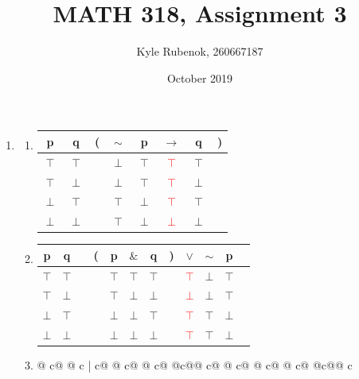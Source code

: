 \documentclass{article}
\title{MATH 318, Assignment 3}
\author{Kyle Rubenok, 260667187}
\date{October 2019}
\begin{document}
\maketitle

    \begin{enumerate}
        \item 
            \begin{enumerate}
                \item
                    \begin{tabular}{ c  c | c  c  c  c  c  c }
                    p & q & ( & $\sim$ & p & $\rightarrow$ & q & )\\
                    \hline 
                    $\top$ & $\top$ &  & $\perp$ & $\top$ & \textcolor{red}{$\top$} & $\top$ & \\
                    $\top$ & $\perp$ &  & $\perp$ & $\top$ & \textcolor{red}{$\top$} & $\perp$ & \\
                    $\perp$ & $\top$ &  & $\top$ & $\perp$ & \textcolor{red}{$\top$} & $\top$ & \\
                    $\perp$ & $\perp$ &  & $\top$ & $\perp$ & \textcolor{red}{$\perp$} & $\perp$ & \\
                    \end{tabular}
                \item
                    \begin{tabular}{@{ }c@{ }@{ }c | c@{ }@{}c@{}@{ }c@{ }@{ }c@{ }@{ }c@{ }@{}c@{}@{ }c@{ }    @{ }c@{ }@{ }c@{ }@{ }c} p & q &  & ( & p & $\&$ & q & ) & $\lor$ & $\sim$ & p & \\
                    \hline 
                    $\top$ & $\top$ &  &  & $\top$ & $\top$ & $\top$ &  & \textcolor{red}{$\top$} & $\bot$ &     $\top$ & \\
                    $\top$ & $\bot$ &  &  & $\top$ & $\bot$ & $\bot$ &  & \textcolor{red}{$\bot$} & $\bot$ &     $\top$ & \\
                    $\bot$ & $\top$ &  &  & $\bot$ & $\bot$ & $\top$ &  & \textcolor{red}{$\top$} & $\top$ &     $\bot$ & \\
                    $\bot$ & $\bot$ &  &  & $\bot$ & $\bot$ & $\bot$ &  & \textcolor{red}{$\top$} & $\top$ &     $\bot$ & \\
                    \end{tabular}
                \item
                    \begin{tabular}{@{ }c@{ }@{ }c | c@{ }@{ }c@{ }@{ }c@{ }@{}c@{}@{ }c@{ }@{ }c@{ }@{ }c@ { }@{ }c@{ }@{}c@{}@{ }c}

\end{tabular}
\end{enumerate}
\end{enumerate}
\end{document}

